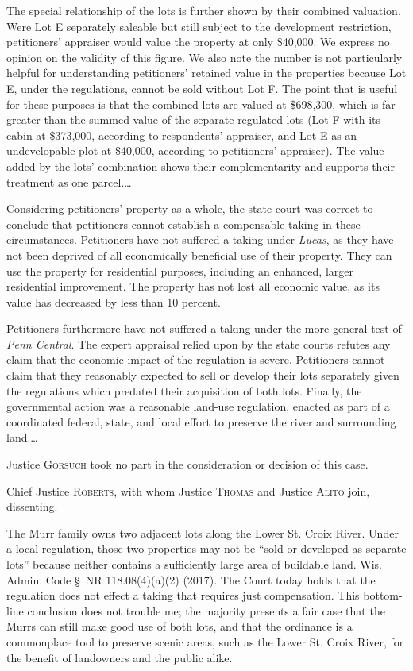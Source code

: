 The special relationship of the lots is further shown by their combined
valuation. Were Lot E separately saleable but still subject to the development
restriction, petitioners' appraiser would value the property at only \$40,000.
We express no opinion on the validity of this figure. We also note the number is
not particularly helpful for understanding petitioners' retained value in the
properties because Lot E, under the regulations, cannot be sold without Lot F.
The point that is useful for these purposes is that the combined lots are valued
at \$698,300, which is far greater than the summed value of the separate
regulated lots (Lot F with its cabin at \$373,000, according to respondents'
appraiser, and Lot E as an undevelopable plot at \$40,000, according to
petitioners' appraiser). The value added by the lots' combination shows their
complementarity and supports their treatment as one parcel.\ldots

Considering petitioners' property as a whole, the state court was correct to
conclude that petitioners cannot establish a compensable taking in these
circumstances. Petitioners have not suffered a taking under \textit{Lucas}, as
they have not been deprived of all economically beneficial use of their
property. They can use the property for residential purposes, including an
enhanced, larger residential improvement. The property has not lost all economic
value, as its value has decreased by less than 10 percent. 

Petitioners furthermore have not suffered a taking under the more general test
of \textit{Penn Central}. The expert appraisal relied upon by the state courts
refutes any claim that the economic impact of the regulation is severe.
Petitioners cannot claim that they reasonably expected to sell or develop their
lots separately given the regulations which predated their acquisition of both
lots. Finally, the governmental action was a reasonable land-use regulation,
enacted as part of a coordinated federal, state, and local effort to preserve
the river and surrounding land.\ldots

Justice \textsc{Gorsuch} took no part in the consideration or decision of this
case.

\opinion Chief Justice \textsc{Roberts}, with whom Justice \textsc{Thomas} and
Justice \textsc{Alito} join, dissenting.

The Murr family owns two adjacent lots along the Lower St. Croix River. Under a
local regulation, those two properties may not be ``sold or developed as
separate lots'' because neither contains a sufficiently large area of buildable
land. Wis. Admin. Code \S~NR 118.08(4)(a)(2) (2017). The Court today holds that
the regulation does not effect a taking that requires just compensation. This
bottom-line conclusion does not trouble me; the majority presents a fair case
that the Murrs can still make good use of both lots, and that the ordinance is a
commonplace tool to preserve scenic areas, such as the Lower St. Croix River,
for the benefit of landowners and the public alike.

